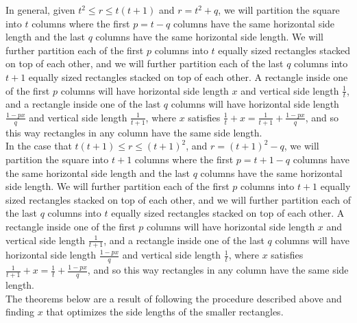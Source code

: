 \documentclass{article}
\begin{document}
In general, given $t^2 \leq r \leq t(t+1)$ and $r = t^2 + q$, we will partition the square into $t$ columns where the first $p = t-q$ columns have the same horizontal side length and the last $q$ columns have the same horizontal side length. We will further partition each of the first $p$ columns into $t$ equally sized rectangles stacked on top of each other, and we will further partition each of the last $q$ columns into $t+1$ equally sized rectangles stacked on top of each other. A rectangle inside one of the first $p$ columns will have horizontal side length $x$ and vertical side length $\frac{1}{t}$, and a rectangle inside one of the last $q$ columns will have horizontal side length $\frac{1-px}{q}$ and vertical side length $\frac{1}{t+1}$, where $x$ satisfies $\frac{1}{t} + x = \frac{1}{t+1} + \frac{1-px}{q}$, and so this way rectangles in any column have the same side length. \\

In the case that $t(t+1) \leq r \leq (t+1)^2$, and $r = (t+1)^2-q$, we will partition the square into $t+1$ columns where the first $p = t+1-q$ columns have the same horizontal side length and the last $q$ columns have the same horizontal side length. We will further partition each of the first $p$ columns into $t+1$ equally sized rectangles stacked on top of each other, and we will further partition each of the last $q$ columns into $t$ equally sized rectangles stacked on top of each other. A rectangle inside one of the first $p$ columns will have horizontal side length $x$ and vertical side length $\frac{1}{t+1}$, and a rectangle inside one of the last $q$ columns will have horizontal side length $\frac{1-px}{q}$ and vertical side length $\frac{1}{t}$, where $x$ satisfies $\frac{1}{t+1} + x = \frac{1}{t} + \frac{1-px}{q}$, and so this way rectangles in any column have the same side length. \\

The theorems below are a result of following the procedure described above and finding $x$ that optimizes the side lengths of the smaller rectangles. \\

\univone*
\end{document}
